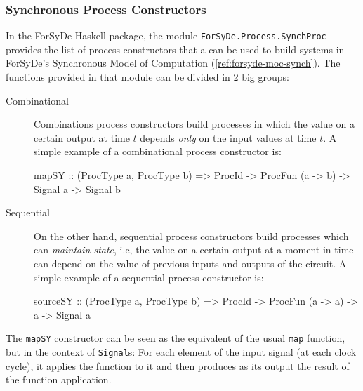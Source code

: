         \subsubsection{Synchronous Process Constructors}
        \label{subsubsec:forsyde-synchprocs}
            In the ForSyDe Haskell package, the module \texttt{ForSyDe.Process.SynchProc} provides
            the list of process constructors that a can be used to build systems in ForSyDe's
            Synchronous Model of Computation (\ref{ref:forsyde-moc-synch}). The functions provided
            in that module can be divided in 2 big groups:

            \begin{description}

                \item[Combinational] Combinations process constructors build processes in which the
                    value on a certain output at time $t$ depends \emph{only} on the input values at
                    time $t$. A simple example of a combinational process constructor is:

                    \begin{haskellcode}
        mapSY :: (ProcType a, ProcType b) => ProcId
              -> ProcFun (a -> b) -> Signal a -> Signal b
                    \end{haskellcode}

                \item[Sequential] On the other hand, sequential process constructors build processes
                    which can \emph{maintain state}, i.e, the value on a certain output at a moment
                    in time can depend on the value of previous inputs and outputs of the circuit. A
                    simple example of a sequential process constructor is:

                    \begin{haskellcode}
        sourceSY :: (ProcType a, ProcType b) => ProcId
                 -> ProcFun (a -> a) -> a -> Signal a
                    \end{haskellcode}

            \end{description}

            The \texttt{mapSY} constructor can be seen as the equivalent of the usual \texttt{map}
            function, but in the context of \texttt{Signal}s: For each element of the input signal
            (at each clock cycle), it applies the function to it and then produces as its output the
            result of the function application.

